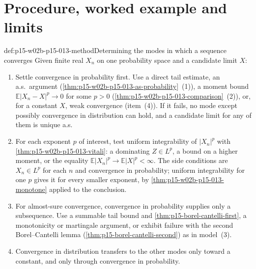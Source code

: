 \section{Procedure, worked example and limits}
\label{sec:p15-w02b-p15-013-use}

\begin{hbmethod}{def:p15-w02b-p15-013-method}{Determining the modes in which a sequence converges}
Given finite real \(X_n\) on one probability space and a candidate
limit \(X\):
\begin{enumerate}
\item Settle convergence in probability first. Use a direct tail
      estimate, an a.s.\ argument (\cref{thm:p15-w02b-p15-013-as-probability}~(1)),
      a moment bound \(\mathbb E|X_n-X|^p\to0\) for some \(p>0\)
      (\cref{thm:p15-w02b-p15-013-comparison}~(2)), or, for a constant
      \(X\), weak convergence (item~(4)). If it fails, no mode except
      possibly convergence in distribution can hold, and a candidate
      limit for any of them is unique a.s.
\item For each exponent \(p\) of interest, test uniform integrability
      of \(|X_n|^p\) with \cref{thm:p15-w02b-p15-013-vitali}: a
      dominating \(Z\in L^p\), a bound on a higher moment, or the
      equality \(\mathbb E|X_n|^p\to\mathbb E|X|^p<\infty\). The side
      conditions are \(X_n\in L^p\) for each \(n\) and convergence in
      probability; uniform integrability for one \(p\) gives it for every
      smaller exponent, by \cref{thm:p15-w02b-p15-013-monotone} applied
      to the conclusion.
\item For almost-sure convergence, convergence in probability supplies
      only a subsequence. Use a summable tail bound and
      \cref{thm:p15-borel-cantelli-first}, a monotonicity or martingale
      argument, or exhibit failure with the second Borel--Cantelli lemma
      (\cref{thm:p15-borel-cantelli-second}) as in model~(3).
\item Convergence in distribution transfers to the other modes only
      toward a constant, and only through convergence in probability.
\end{enumerate}
\end{hbmethod}

